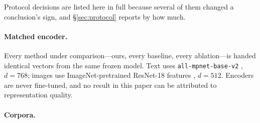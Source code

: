 \label{sec:setup}

Protocol decisions are listed here in full because several of them changed a conclusion's
sign, and \S\ref{sec:protocol} reports by how much.

\paragraph{Matched encoder.} Every method under comparison---ours, every baseline, every
ablation---is handed identical vectors from the same frozen model. Text uses
\texttt{all-mpnet-base-v2} \citep{reimers2019sbert}, $d{=}768$; images use ImageNet-pretrained
ResNet-18 features \citep{he2016resnet}, $d{=}512$. Encoders are never fine-tuned, and no
result in this paper can be attributed to representation quality.

\paragraph{Corpora.}

